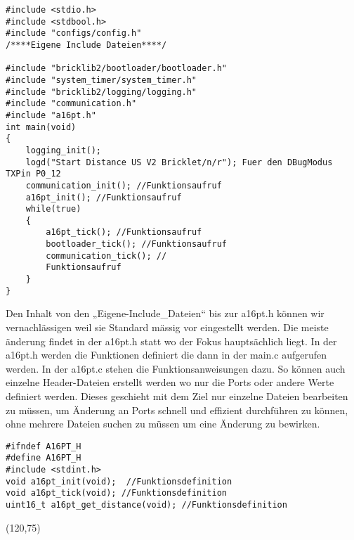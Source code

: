 \begin{lstlisting}
#include <stdio.h>
#include <stdbool.h>
#include "configs/config.h"
/****Eigene Include Dateien****/

#include "bricklib2/bootloader/bootloader.h"
#include "system_timer/system_timer.h"
#include "bricklib2/logging/logging.h"
#include "communication.h"
#include "a16pt.h"
int main(void)
{ 
	logging_init(); 
	logd("Start Distance US V2 Bricklet/n/r"); Fuer den DBugModus TXPin P0_12 
	communication_init(); //Funktionsaufruf
	a16pt_init(); //Funktionsaufruf	
	while(true)
	{
		a16pt_tick(); //Funktionsaufruf
		bootloader_tick(); //Funktionsaufruf
		communication_tick(); //
		Funktionsaufruf
	}
}
\end{lstlisting}
Den Inhalt von den „Eigene-Include\_Dateien“ bis zur a16pt.h können wir vernachlässigen weil sie Standard mässig vor eingestellt werden.
Die meiste änderung findet in der a16pt.h statt wo der Fokus hauptsächlich liegt.
In der a16pt.h werden die Funktionen definiert die dann in der main.c aufgerufen werden. In der a16pt.c stehen die Funktionsanweisungen dazu. So können auch einzelne Header-Dateien erstellt werden wo nur die Ports oder andere Werte definiert werden. Dieses geschieht mit dem Ziel nur einzelne Dateien bearbeiten zu müssen, um Änderung an Ports schnell und effizient durchführen zu können, ohne mehrere Dateien suchen zu müssen um eine Änderung zu bewirken.\\
\begin{lstlisting}
#ifndef A16PT_H
#define A16PT_H
#include <stdint.h>
void a16pt_init(void);	//Funktionsdefinition
void a16pt_tick(void); //Funktionsdefinition
uint16_t a16pt_get_distance(void); //Funktionsdefinition
\end{lstlisting}


\begin{struktogramm}(120,75)
\forever
{}
\whileend
{}
\whileend
\foreverend
\end{struktogramm}

